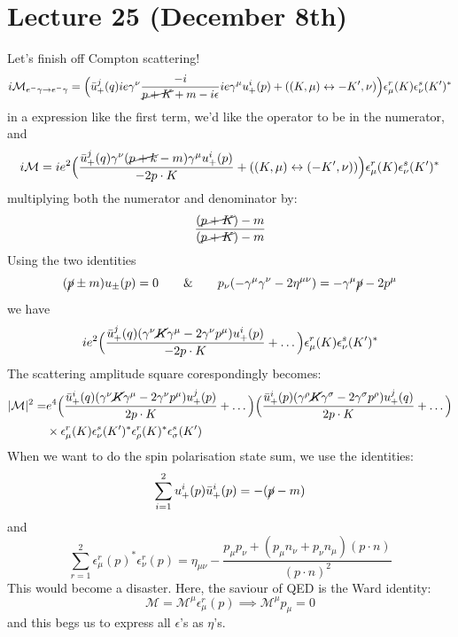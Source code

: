 \section{Lecture 25 (December 8th)}
\begin{ex}
Let's finish off Compton scattering! 
\[i\mathcal{M}_{e^{-}\gamma \rightarrow e^{-}\gamma }=\Big(\bar{u}^{j}_{+}(q)ie\gamma ^{\nu }\dfrac{-i}{\cancel{p+K}+m-i\epsilon }ie\gamma ^{\mu }u^{i}_{+}(p)+((K,\mu )\leftrightarrow -K',\nu )\Big)\epsilon ^{r}_{\mu }(K)\epsilon ^{s}_{\nu }(K')^{*}\]
in a expression like the first term, we'd like the operator to be in the numerator, and
\[i\mathcal{M}=ie^2\Big(\dfrac{\bar{u}_{+}^{j}(q)\gamma ^{\nu }(\cancel{p+k}-m)\gamma ^{\mu }u^{i}_{+}(p)}{-2p\cdot K}+((K,\mu )\leftrightarrow (-K',\nu ))\Big)\epsilon _{\mu }^{r}(K)\epsilon ^{s}_{\nu }(K')^{*}\]
multiplying both the numerator and denominator by:
\[\dfrac{(\cancel{p+K})-m}{(\cancel{p+K})-m}\]
Using the two identities
\[(\cancel{p}\pm m)u_{\pm}(p)=0\qquad\&\qquad p_{\nu }(-\gamma ^{\mu }\gamma ^{\nu }-2\eta ^{\mu \nu })=-\gamma ^{\mu }\cancel{p}-2p^{\mu }\]
we have
\[ie^2\Big(\dfrac{\bar{u}^{j}_{+}(q)(\gamma ^{\nu }\cancel{K}\gamma ^{\mu }-2\gamma ^{\nu }p^{\mu })u_{+}^{i}(p)}{-2p\cdot K}+\ldots \Big)\epsilon ^{r}_{\mu }(K)\epsilon ^{s}_{\nu }(K')^{*}\]
The scattering amplitude square corespondingly becomes:
\[\begin{align*}
|\mathcal{M}|^2=&e^{4}\Big(\dfrac{\bar{u}^{i}_{+}(q)(\gamma ^{\nu }\cancel{K}\gamma ^{\mu }-2\gamma ^{\nu }p^{\mu })u^{j}_{+}(p)}{2p\cdot K}+\ldots \Big)\Big(\dfrac{\bar{u}_{+}^{i}(p)(\gamma ^{\rho }\cancel{K}\gamma ^{\sigma }-2\gamma ^{\sigma }p^{\rho })u^{j}_{+}(q)}{2p\cdot K}+\ldots \Big)\\
&\times \epsilon ^{r}_{\mu }(K)\epsilon ^{s}_{\nu }(K')^{*}\epsilon ^{r}_{\rho }(K)^{*}\epsilon ^{s}_{\sigma }(K')
\end{align*}\]
When we want to do the spin polarisation state sum, we use the identities:
\[\sum ^{2}_{i=1}u^{i}_{+}(p)\bar{u}^{i}_{+}(p)=-(\cancel{p}-m)\]
and
\[\sum ^{2}_{r=1}\epsilon _{\mu }^{r}(p)^{*}\epsilon ^{r}_{\nu }(p)=\eta _{\mu \nu }-\dfrac{p_{\mu }p_{\nu }+(p_{\mu }n_{\nu }+p_{\nu }n_{\mu })(p\cdot n)}{(p\cdot n)^2}\]
This would become a disaster. Here, the saviour of QED is the Ward identity:
\[\mathcal{M}=\mathcal{M}^{\mu }\epsilon ^{r}_{\mu }(p)\implies \mathcal{M}^{\mu }p_{\mu }=0\]
and this begs us to express all $\epsilon $'s as $\eta $'s. 
\end{ex}
\vspace{2ex}
